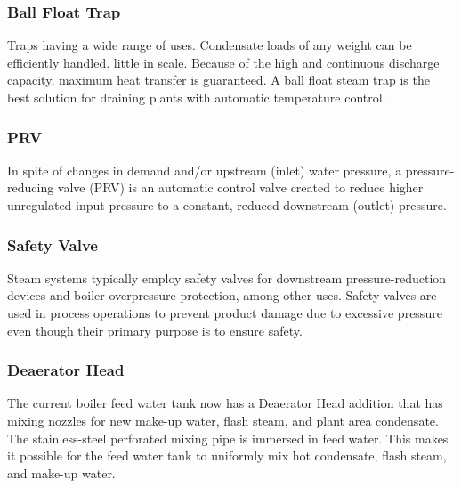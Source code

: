 \subsubsection{Ball Float Trap}
Traps having a wide range of uses. Condensate loads of any weight can be efficiently handled. little in scale. Because of the high and continuous discharge capacity, maximum heat transfer is guaranteed. A ball float steam trap is the best solution for draining plants with automatic temperature control.

\subsubsection{PRV}
In spite of changes in demand and/or upstream (inlet) water pressure, a pressure-reducing valve (PRV) is an automatic control valve created to reduce higher unregulated input pressure to a constant, reduced downstream (outlet) pressure.

\subsubsection{Safety Valve}
Steam systems typically employ safety valves for downstream pressure-reduction devices and boiler overpressure protection, among other uses. Safety valves are used in process operations to prevent product damage due to excessive pressure even though their primary purpose is to ensure safety.

\subsubsection{Deaerator Head}
The current boiler feed water tank now has a Deaerator Head addition that has mixing nozzles for new make-up water, flash steam, and plant area condensate. The stainless-steel perforated mixing pipe is immersed in feed water. This makes it possible for the feed water tank to uniformly mix hot condensate, flash steam, and make-up water.
